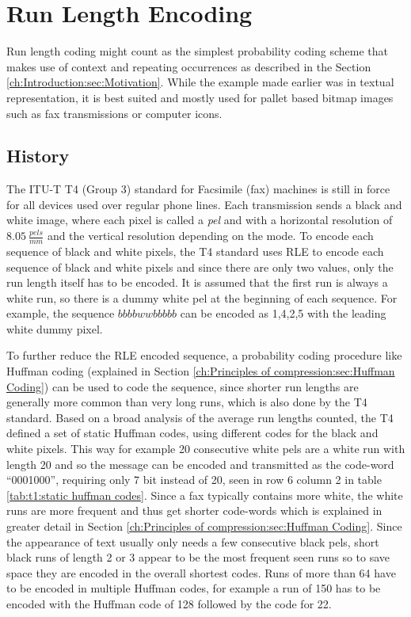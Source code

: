 \section{Run Length Encoding}
\label{ch:Principles of compression:sec:Run Length Encoding}
\par{
	Run length coding might count as the simplest probability coding scheme that makes use of context and repeating occurrences as described in the Section \ref{ch:Introduction:sec:Motivation}. While the example made earlier was in textual representation, it is best suited and mostly used for pallet based bitmap images \cite{palette-image} such as fax transmissions or computer icons.
}

\subsection{History}
\label{ch:Principles of compression:sec:Run Length Encoding:subSec:History}
\par{
 The ITU-T T4 (Group 3) standard for Facsimile (fax) machines \cite{ITU} is still in force for all devices used over regular phone lines. Each transmission sends a black and white image, where each pixel is called a \textit{pel} and with a horizontal resolution of $8.05 \: \frac{pels}{mm}$ and the vertical resolution depending on the mode. To encode each sequence of black and white pixels, the T4 standard uses RLE to encode each sequence of black and white pixels and since there are only two values, only the run length itself has to be encoded. It is assumed that the first run is always a white run, so there is a dummy white pel at the beginning of each sequence. For example, the sequence $bbbbwwbbbbb$ can be encoded as 1,4,2,5 with the leading white dummy pixel.
}
\par{
To further reduce the RLE encoded sequence, a probability coding procedure like Huffman coding (explained in Section \ref{ch:Principles of compression:sec:Huffman Coding}) can be used to code the sequence, since shorter run lengths are generally more common than very long runs, which is also done by the T4 standard. Based on a broad analysis of the average run lengths counted, the T4 defined a set of static Huffman codes, using different codes for the black and white pixels. This way for example 20 consecutive white pels  are a white run with length 20 and so the message can be encoded and transmitted as the code-word \enquote{0001000}, requiring only 7 bit instead of 20, seen in row 6 column 2 in table \ref{tab:t1:static huffman codes}. Since a fax typically contains more white, the white runs are more frequent and thus get shorter code-words which is explained in greater detail in Section \ref{ch:Principles of compression:sec:Huffman Coding}. Since the appearance of text usually only needs a few consecutive black pels, short black runs of length 2 or 3 appear to be the most frequent seen runs so to save space they are encoded in the overall shortest codes. Runs of more than 64 have to be encoded in multiple Huffman codes, for example a run of 150 has to be encoded with the Huffman code of 128 followed by the code for 22.
}
